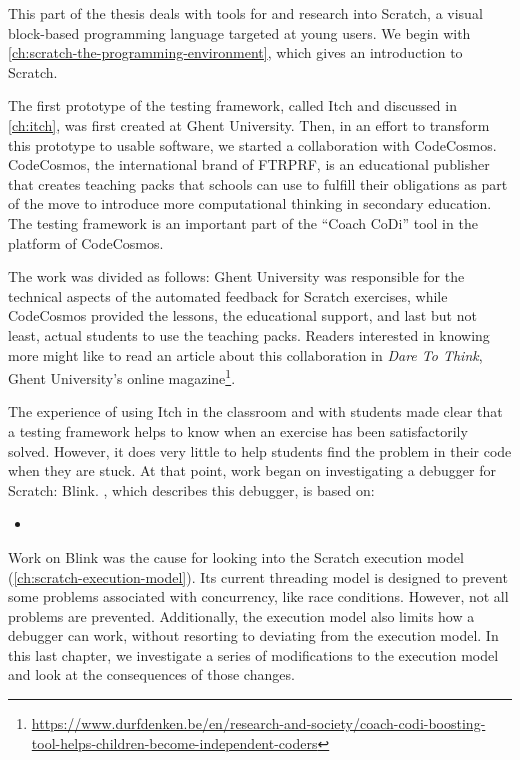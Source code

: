 \documentclass[./main]{subfiles}
\begin{document}
\label{ch:preface-2}

This part of the thesis deals with tools for and research into Scratch, a visual block-based programming language targeted at young users.
We begin with \cref{ch:scratch-the-programming-environment}, which gives an introduction to Scratch.

The first prototype of the testing framework, called Itch and discussed in \cref{ch:itch}, was first created at Ghent University.
Then, in an effort to transform this prototype to usable software, we started a collaboration with CodeCosmos.
CodeCosmos, the international brand of FTRPRF, is an educational publisher that creates teaching packs that schools can use to fulfill their obligations as part of the move to introduce more computational thinking in secondary education.
The testing framework is an important part of the ``Coach CoDi'' tool in the platform of CodeCosmos.

The work was divided as follows: Ghent University was responsible for the technical aspects of the automated feedback for Scratch exercises, while CodeCosmos provided the lessons, the educational support, and last but not least, actual students to use the teaching packs.
Readers interested in knowing more might like to read an article about this collaboration in \textit{Dare To Think}, Ghent University's online magazine\footnote{\url{https://www.durfdenken.be/en/research-and-society/coach-codi-boosting-tool-helps-children-become-independent-coders}}.

The experience of using Itch in the classroom and with students made clear that a testing framework helps to know when an exercise has been satisfactorily solved.
However, it does very little to help students find the problem in their code when they are stuck.
At that point, work began on investigating a debugger for Scratch: Blink.
, which describes this debugger, is based on:

\begin{itemize}
    \item {}
\end{itemize}

Work on Blink was the cause for looking into the Scratch execution model (\cref{ch:scratch-execution-model}).
Its current threading model is designed to prevent some problems associated with concurrency, like race conditions.
However, not all problems are prevented.
Additionally, the execution model also limits how a debugger can work, without resorting to deviating from the execution model.
In this last chapter, we investigate a series of modifications to the execution model and look at the consequences of those changes.
\end{document}
